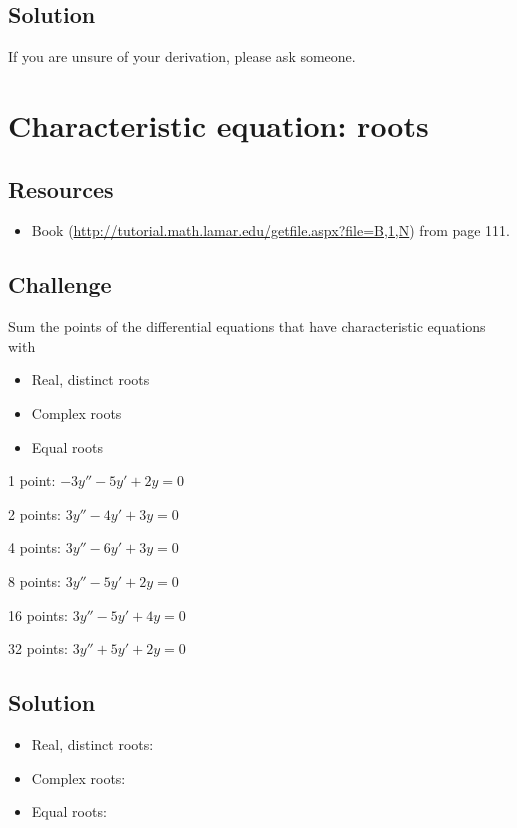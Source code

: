 \subsection*{Solution}
If you are unsure of your derivation, please ask someone.




\newpage
\section{Characteristic equation: roots}

\subsection*{Resources}
\begin{itemize}
    \item Book (\url{http://tutorial.math.lamar.edu/getfile.aspx?file=B,1,N}) from page 111.
\end{itemize}

\subsection*{Challenge}
Sum the points of the differential equations that have characteristic equations with
\begin{itemize}
    \item Real, distinct roots
    \item Complex roots
    \item Equal roots
\end{itemize}

1 point: $\displaystyle -3 y'' - 5 y' + 2 y = 0$ %

2 points: $\displaystyle 3 y'' - 4 y' + 3 y = 0$ %

4 points: $\displaystyle 3 y'' - 6 y' + 3 y = 0$ %

8 points: $\displaystyle 3 y'' - 5 y' + 2 y = 0$ %

16 points: $\displaystyle 3 y'' - 5 y' + 4 y = 0$ %

32 points: $\displaystyle 3 y'' + 5 y' + 2 y = 0$ %

\subsection*{Solution}

\begin{itemize}
    \item Real, distinct roots: 
    \item Complex roots: 
    \item Equal roots: 
\end{itemize}




